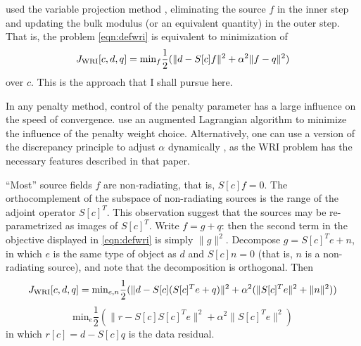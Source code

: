\cite{LeeuwenHerrmann:16} used the variable projection method
\cite[]{GolubPereyra:03}, eliminating the source $f$ in the inner step
and updating the bulk modulus (or an equivalent quantity) in the outer
step. That is, the problem \ref{eqn:defwri} is equivalent to
minimization of
\begin{equation}
\label{eqn:defvpm}
  J_{\rm WRI}[c,d,q] =
  \mbox{min}_f \frac{1}{2}(\| d-S[c]f\|^2+\alpha^2\|f-q\|^2)
\end{equation}
over $c$. This is the approach that I shall pursue here.

In any penalty method, control of the penalty
parameter has a large influence on the speed of
convergence. \cite{Aghamiry:19} use an augmented Lagrangian algorithm
to minimize the influence of the penalty weight choice. Alternatively, one can use a version of the discrepancy principle to adjust $\alpha$ dynamically \cite[]{FuSymes2017discrepancy}, as the WRI problem has the necessary features described in that paper.

``Most'' source fields $f$ are non-radiating,
that is, $S[c]f=0$. The orthocomplement of the subspace of
non-radiating sources is the range of the adjoint operator
$S[c]^T$. This observation suggest that the sources may be re-parametrized as images of
$S[c]^T$. Write $f = g + q$: then the second term in
the objective displayed in \ref{eqn:defwri} is simply $\|g\|^2$.
Decompose $g = S[c]^Te + n$, in
which $e$ is the same type of object as $d$ and $S[c]n=0$ (that
is, $n$ is a non-radiating
source), and note that the decomposition is orthogonal. Then
\[
  J_{\rm WRI}[c,d,q] =
  \mbox{min}_{e,n} \frac{1}{2}(\| d-S[c](S[c]^Te+q)\|^2+\alpha^2(\|S[c]^Te\|^2+\|n\|^2))
  \]
\begin{equation}
  \label{eqn:defvpmred}
   \mbox{min}_{e} \frac{1}{2}(\|r-S[c]S[c]^Te\|^2+\alpha^2\|S[c]^Te\|^2)
 \end{equation}
 in which $r[c]=d-S[c]q$ is the data residual.
 
